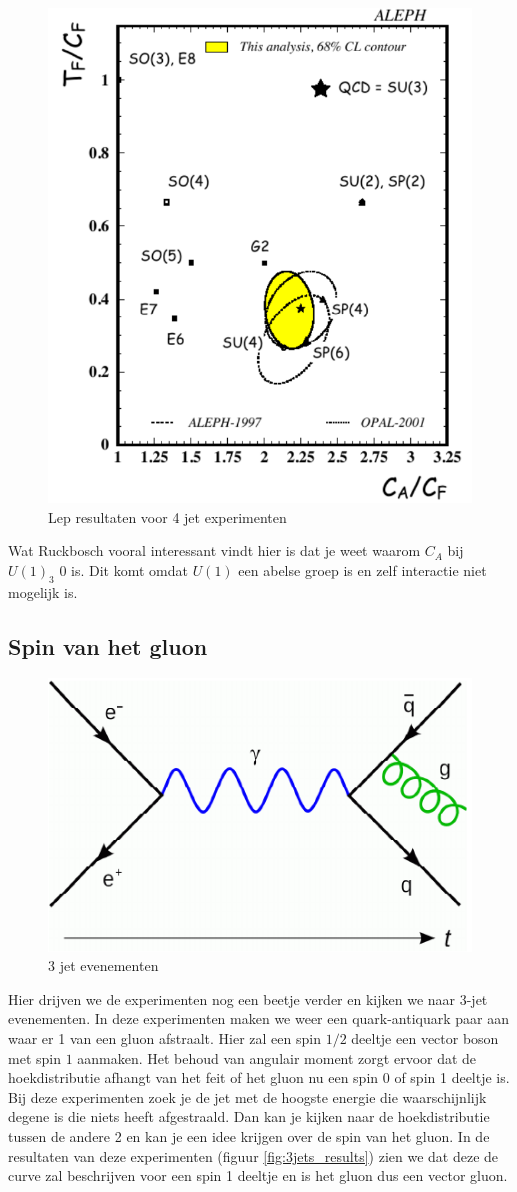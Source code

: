 \documentclass[../main.tex]{subfiles}
\begin{document}
\begin{figure}[h]
    \centering
    \includegraphics[width=0.4\linewidth]{QCD/4jets_results.png}
    \caption{Lep resultaten voor 4 jet experimenten}%
    \label{fig:4jets_results}
\end{figure}

{\color{red} Wat Ruckbosch vooral interessant vindt hier is dat je weet waarom $C_A$ bij $U(1)_3$ 0 is. Dit komt omdat $U(1)$ een abelse groep is en zelf interactie niet mogelijk is.}

\subsection{Spin van het gluon}%
\label{sub:spin_van_het_gluon}

\begin{figure}[h]
    \centering
    \includegraphics[width=0.4\linewidth]{QCD/3jets.png}
    \caption{3 jet evenementen}%
    \label{fig:3jets}
\end{figure}

Hier drijven we de experimenten nog een beetje verder en kijken we naar 3-jet evenementen. In deze experimenten maken we weer een quark-antiquark paar aan waar er 1 van een gluon afstraalt. Hier zal een spin $1/2$ deeltje een vector boson met spin $1$ aanmaken. Het behoud van angulair moment zorgt ervoor dat de hoekdistributie afhangt van het feit of het gluon nu een spin 0 of spin 1 deeltje is.
Bij deze experimenten zoek je de jet met de hoogste energie die waarschijnlijk degene is die niets heeft afgestraald. Dan kan je kijken naar de hoekdistributie tussen de andere 2 en kan je een idee krijgen over de spin van het gluon. In de resultaten van deze experimenten (figuur \ref{fig:3jets_results}) zien we dat deze de curve zal beschrijven voor een spin 1 deeltje en is het gluon dus een vector gluon.
\end{document}

